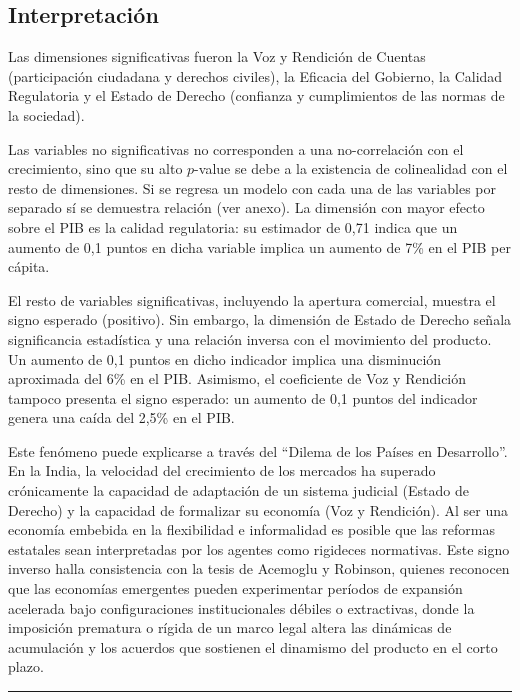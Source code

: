 \documentclass[11pt, a4paper]{article}
\begin{document}
\subsection{Interpretación}

Las dimensiones significativas fueron la Voz y Rendición de Cuentas (participación ciudadana y derechos civiles), la Eficacia del Gobierno, la Calidad Regulatoria y el Estado de Derecho (confianza y cumplimientos de las normas de la sociedad).

Las variables no significativas no corresponden a una no-correlación con el crecimiento, sino que su alto $p$-value se debe a la existencia de colinealidad con el resto de dimensiones. Si se regresa un modelo con cada una de las variables por separado sí se demuestra relación (ver anexo). La dimensión con mayor efecto sobre el PIB es la calidad regulatoria: su estimador de 0,71 indica que un aumento de 0,1 puntos en dicha variable implica un aumento de 7\% en el PIB per cápita.

El resto de variables significativas, incluyendo la apertura comercial, muestra el signo esperado (positivo). Sin embargo, la dimensión de Estado de Derecho señala significancia estadística y una relación inversa con el movimiento del producto. Un aumento de 0,1 puntos en dicho indicador implica una disminución aproximada del 6\% en el PIB. Asimismo, el coeficiente de Voz y Rendición tampoco presenta el signo esperado: un aumento de 0,1 puntos del indicador genera una caída del 2,5\% en el PIB.

Este fenómeno puede explicarse a través del ``Dilema de los Países en Desarrollo''. En la India, la velocidad del crecimiento de los mercados ha superado crónicamente la capacidad de adaptación de un sistema judicial (Estado de Derecho) y la capacidad de formalizar su economía (Voz y Rendición). Al ser una economía embebida en la flexibilidad e informalidad es posible que las reformas estatales sean interpretadas por los agentes como rigideces normativas. Este signo inverso halla consistencia con la tesis de Acemoglu y Robinson, quienes reconocen que las economías emergentes pueden experimentar períodos de expansión acelerada bajo configuraciones institucionales débiles o extractivas, donde la imposición prematura o rígida de un marco legal altera las dinámicas de acumulación y los acuerdos que sostienen el dinamismo del producto en el corto plazo.

\vspace{0.5em}
\noindent\rule{\textwidth}{0.6pt}
\vspace{0.5em}
\end{document}
